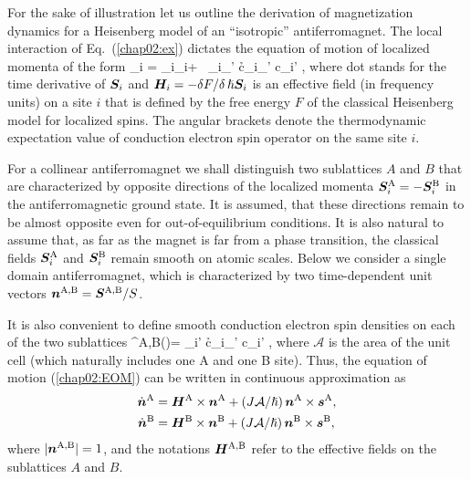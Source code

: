 For the sake of illustration let us outline the derivation of magnetization dynamics for a Heisenberg model of an ``isotropic'' antiferromagnet. The local interaction of Eq.~(\ref{chap02:ex}) dictates the equation of motion of localized momenta of the form
\be
\label{chap02:EOM}
_i = _i\times {}_i+ \, _i\times \s_{\sigma\sigma'} \lt\la c\h_{i\sigma}\bb{\sigma}_{\sigma\sigma'} c\0_{i\sigma'} \rt\ra,
\e
where dot stands for the time derivative of $\boldsymbol{S}_i$ and $\boldsymbol{H}_i=-\delta F/ \delta\, \hslash\boldsymbol{S}_i$ is an effective field (in frequency units) on a site $i$  that is defined by the free energy $F$ of the classical Heisenberg model for localized spins. The angular brackets denote the thermodynamic expectation value of conduction electron spin operator on the same site $i$. 

For a collinear antiferromagnet we shall distinguish two sublattices $A$ and $B$ that are characterized by opposite directions of the localized momenta $\boldsymbol{S}_i^\textrm{A}=-\boldsymbol{S}_i^\textrm{B}$ in the antiferromagnetic ground state. It is assumed, that these directions remain to be almost opposite even for out-of-equilibrium conditions. It is also natural to assume that, as far as the magnet is far from a phase transition, the classical fields $\boldsymbol{S}_i^\textrm{A}$ and $\boldsymbol{S}_i^\textrm{B}$ remain smooth on atomic scales. Below we consider a single domain antiferromagnet, which is characterized by two time-dependent unit vectors $\boldsymbol{n}^\textrm{A,B}=\boldsymbol{S}^\textrm{A,B}/S$. 

It is also convenient to define smooth conduction electron spin densities on each of the two sublattices
\be
{}^\textrm{A,B}()=  \s_{i\sigma\sigma'} \lt\la c\h_{i\sigma}\bb{\sigma}_{\sigma\sigma'} c\0_{i\sigma'} \rt\ra\;,
\e
where $\mathcal{A}$ is the area of the unit cell (which naturally includes one A and one B site). Thus, the equation of motion (\ref{chap02:EOM}) can be written in  continuous approximation as
\beml
\label{chap02:EOMAFM}
\begin{align}
\dot{\boldsymbol{n}}^\textrm{A} &= \boldsymbol{H}^\textrm{A}\times \boldsymbol{n}^\textrm{A}+ (J\mathcal{A}/\hslash)\, \boldsymbol{n}^\textrm{A}\times \boldsymbol{s}^\textrm{A},\\
\dot{\boldsymbol{n}}^\textrm{B}&= \boldsymbol{H}^\textrm{B}\times \boldsymbol{n}^\textrm{B}+ (J\mathcal{A}/\hslash)\, \boldsymbol{n}^\textrm{B}\times \boldsymbol{s}^\textrm{B},
\end{align}
\eml
where $|\boldsymbol{n}^\textrm{A,B}|=1$, and the notations $\boldsymbol{H}^\textrm{A,B}$ refer to the effective fields on the sublattices $A$ and $B$. 

